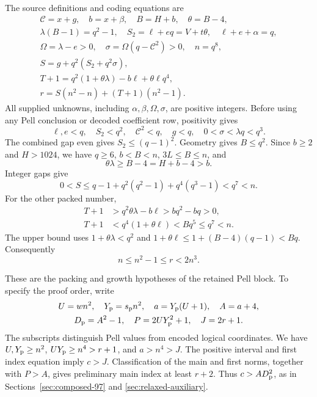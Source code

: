 The source definitions and coding equations are
\begin{equation}\label{eq:affine-radix-packing}
 \begin{gathered}
 \mathcal C=x+g,\quad b=x+\beta,\quad B=H+b,\quad\theta=B-4,\\
 \lambda(B-1)=q^2-1,\quad
 S_2=\ell+eq=V+t\theta,\quad\ell+e+\alpha=q,\\
 \Omega=\lambda-e>0,\quad
 \sigma=\Omega(q-\mathcal C^2)>0,\quad n=q^8,\\
 S=g+q^2(S_2+q^2\sigma),\\
 T+1=q^2(1+\theta\lambda)-b\ell+\theta\ell q^4,\\
 r=S(n^2-n)+(T+1)(n^2-1).
 \end{gathered}
\end{equation}
All supplied unknowns, including $\alpha,\beta,\Omega,\sigma$,
are positive integers. Before using any Pell conclusion or
decoded coefficient row, positivity gives
\begin{equation}\label{eq:affine-radix-preliminary}
 \ell,e<q,\quad S_2<q^2,\quad\mathcal C^2<q,\quad g<q,
 \quad0<\sigma<\lambda q<q^3.
\end{equation}
The combined gap even gives $S_2\le(q-1)^2$. Geometry gives
$B\le q^2$. Since $b\ge2$ and $H>1024$, we have $q\ge6$,
$b<B<n$, $3L\le B\le n$, and
\[
 \theta\lambda\ge B-4=H+b-4>b.
\]
Integer gaps give
\[
 0<S\le q-1+q^2(q^2-1)+q^4(q^3-1)<q^7<n.
\]
For the other packed number,
\begin{equation}\label{eq:affine-radix-packed-range}
 \begin{aligned}
 T+1&>q^2\theta\lambda-b\ell>bq^2-bq>0,\\
 T+1&<q^4(1+\theta\ell)<Bq^5\le q^7<n.
 \end{aligned}
\end{equation}
The upper bound uses $1+\theta\lambda<q^2$ and
$1+\theta\ell\le1+(B-4)(q-1)<Bq$. Consequently
\begin{equation}\label{eq:affine-radix-r-range}
 n\le n^2-1\le r<2n^3.
\end{equation}

These are the packing and growth hypotheses of the retained Pell
block. To specify the proof order, write
\[
 \begin{gathered}
 U=wn^2,\quad Y_{\rm p}=s_{\rm p}n^2,\quad
 a=Y_{\rm p}(U+1),\quad A=a+4,\\
 D_{\rm p}=A^2-1,\quad P=2UY_{\rm p}^2+1,\quad J=2r+1.
 \end{gathered}
\]
The subscripts distinguish Pell values from encoded logical
coordinates. We have $U,Y_{\rm p}\ge n^2$,
$UY_{\rm p}\ge n^4>r+1$, and $a>n^4>J$. The positive
interval and first index equation imply $c>J$. Classification
of the main and first norms, together with $P>A$, gives
preliminary main index at least $r+2$. Thus $c>AD_{\rm p}^2$,
as in Sections~\ref{sec:composed-97} and
\ref{sec:relaxed-auxiliary}.

